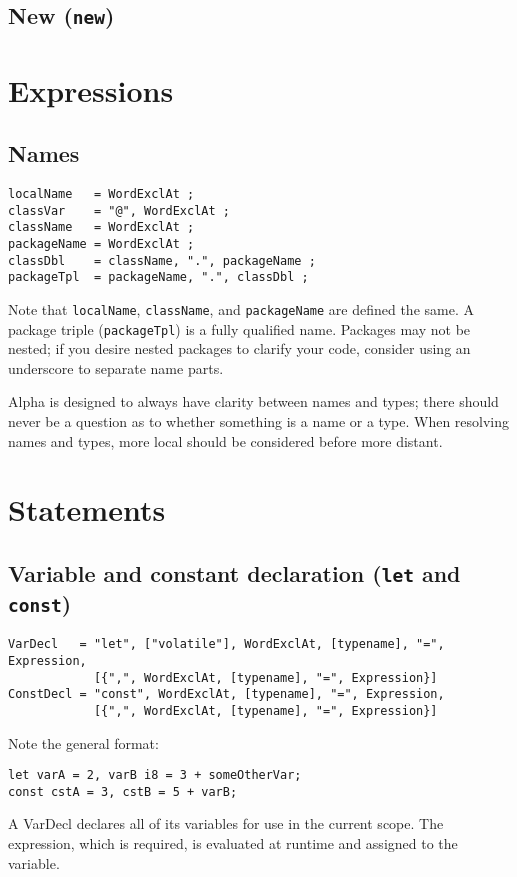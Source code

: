 \documentclass{article}
\begin{document}
\subsection{New (\texttt{new})}
\label{sub:operators:new}

\section{Expressions}
\label{sec:expressions}

\subsection{Names}
\label{sub:expressions:names}
\begin{verbatim}
localName   = WordExclAt ;
classVar    = "@", WordExclAt ;
className   = WordExclAt ;
packageName = WordExclAt ;
classDbl    = className, ".", packageName ;
packageTpl  = packageName, ".", classDbl ;
\end{verbatim}

Note that \texttt{localName}, \texttt{className}, and \texttt{packageName} are
defined the same. A package triple (\texttt{packageTpl}) is a fully qualified
name. Packages may not be nested; if you desire nested packages to clarify your
code, consider using an underscore to separate name parts.

Alpha is designed to always have clarity between names and types; there should
never be a question as to whether something is a name or a type. When resolving
names and types, more local should be considered before more distant.

\section{Statements}
\label{sec:statements}

\subsection{Variable and constant declaration (\texttt{let} and \texttt{const})}
\label{sub:statements:vardecl}
\begin{verbatim}
VarDecl   = "let", ["volatile"], WordExclAt, [typename], "=", Expression,
            [{",", WordExclAt, [typename], "=", Expression}]
ConstDecl = "const", WordExclAt, [typename], "=", Expression,
            [{",", WordExclAt, [typename], "=", Expression}]
\end{verbatim}
Note the general format:
\begin{verbatim}
let varA = 2, varB i8 = 3 + someOtherVar;
const cstA = 3, cstB = 5 + varB;
\end{verbatim}
A VarDecl declares all of its variables for use in the current scope. The
expression, which is required, is evaluated at runtime and assigned to the
variable.
\end{document}

